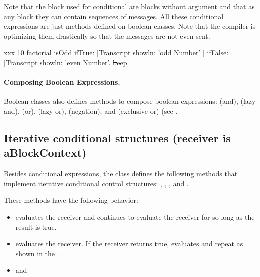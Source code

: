 \documentclass[a4paper,10pt,twoside]{book}
\begin{document}
Note that the block used for conditional are blocks without argument and that as any block they can contain sequences of messages. All these conditional expressions are just methods defined on boolean classes. Note that the compiler is optimizing them drastically so that the messages are not even sent.


\begin{script}[xxx]{xxx}
10 factorial isOdd
   ifTrue: [Transcript showln: 'odd Number' ]
   ifFalse: [Transcript showln: 'even Number'.
                \st beep]
\end{script}

\paragraph{Composing Boolean Expressions.}
Boolean classes also defines methods to compose boolean expressions:
\index{\lct{\&}} (and),
  (lazy and),
\index{|}   (or),
   (lazy or),
 (negation),
and (exclusive or) (see .

\subsection{Iterative conditional structures (receiver is aBlockContext)}
\label{sec:loopCondition}
Besides conditional expressions, the class  defines the following methods that implement  iterative conditional control structures:      ,  , , and  .

These methods have the following behavior:
\begin{itemize}
\item {} evaluates the receiver and continues to evaluate the receiver for so long as the result is true.
\item {} evaluates the receiver. If the receiver returns true, evaluates  and repeat as shown in the .
\item {} and 
\end{itemize}
\end{document}
